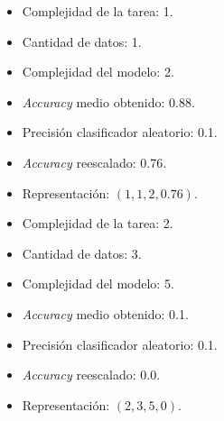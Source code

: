 \begin{ejemplo}
\hspace{2cm}


	    \begin{itemize}
	        \item Complejidad de la tarea: 1.
	        \item Cantidad de datos: 1.
	        \item Complejidad del modelo: 2.
	        \item \textit{Accuracy} medio obtenido: 0.88.
	        \item Precisión clasificador aleatorio: 0.1.
	        \item \textit{Accuracy} reescalado: 0.76.
	        \item Representación: $(1,1,2,0.76)$.
	    \end{itemize}
\end{ejemplo}

\begin{ejemplo}
	\hspace{2cm}
	
	
	    \begin{itemize}
	        
	        \item Complejidad de la tarea: 2.
	        \item Cantidad de datos: 3.
	        \item Complejidad del modelo: 5.
	        \item \textit{Accuracy} medio obtenido: 0.1.
	        \item Precisión clasificador aleatorio: 0.1.
	        \item \textit{Accuracy} reescalado: 0.0.
	        \item Representación: $(2,3,5,0)$.
	    \end{itemize}
\end{ejemplo}


